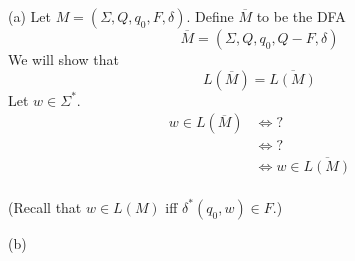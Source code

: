 (a)
Let $M = (\Sigma, Q, q_0, F, \delta)$.
Define $\overline{M}$ to be the DFA
\[
\overline{M} = (\Sigma, Q, q_0, Q - F, \delta)
\]
We will show that
\[
L(\overline{M}) = \overline{L(M)}
\]
Let $w \in \Sigma^*$.
\begin{align*}
  w \in L(\overline{M})
  &\iff ? \\
  &\iff ? \\
  &\iff w \in \overline{L(M)} \\
\end{align*}

(Recall that $w \in L(M)$ iff $\delta^*(q_0, w) \in F$.)

(b)
